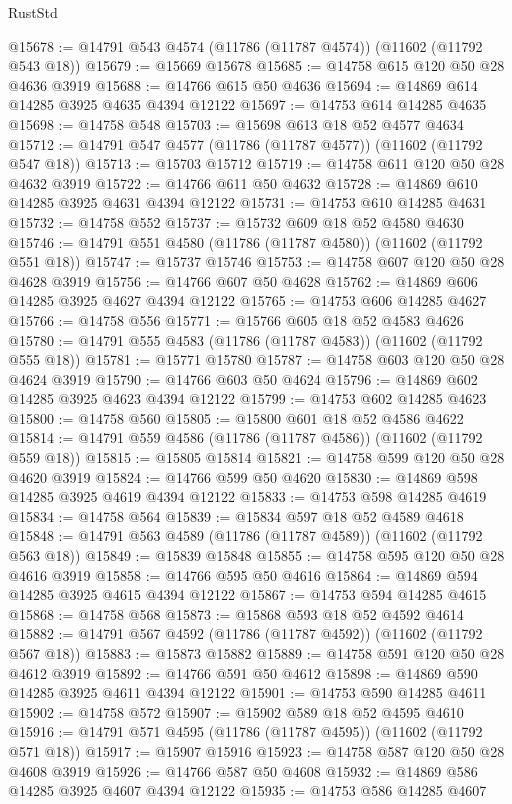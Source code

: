 \begin{lexlean}{RustStd}
\begin{coremodule}
@15678 := @14791 @543 @4574 (@11786 (@11787 @4574)) (@11602 (@11792 @543 @18))
@15679 := @15669 @15678
@15685 := @14758 @615 @120 @50 @28 @4636 @3919
@15688 := @14766 @615 @50 @4636
@15694 := @14869 @614 @14285 @3925 @4635 @4394 @12122
@15697 := @14753 @614 @14285 @4635
@15698 := @14758 @548
@15703 := @15698 @613 @18 @52 @4577 @4634
@15712 := @14791 @547 @4577 (@11786 (@11787 @4577)) (@11602 (@11792 @547 @18))
@15713 := @15703 @15712
@15719 := @14758 @611 @120 @50 @28 @4632 @3919
@15722 := @14766 @611 @50 @4632
@15728 := @14869 @610 @14285 @3925 @4631 @4394 @12122
@15731 := @14753 @610 @14285 @4631
@15732 := @14758 @552
@15737 := @15732 @609 @18 @52 @4580 @4630
@15746 := @14791 @551 @4580 (@11786 (@11787 @4580)) (@11602 (@11792 @551 @18))
@15747 := @15737 @15746
@15753 := @14758 @607 @120 @50 @28 @4628 @3919
@15756 := @14766 @607 @50 @4628
@15762 := @14869 @606 @14285 @3925 @4627 @4394 @12122
@15765 := @14753 @606 @14285 @4627
@15766 := @14758 @556
@15771 := @15766 @605 @18 @52 @4583 @4626
@15780 := @14791 @555 @4583 (@11786 (@11787 @4583)) (@11602 (@11792 @555 @18))
@15781 := @15771 @15780
@15787 := @14758 @603 @120 @50 @28 @4624 @3919
@15790 := @14766 @603 @50 @4624
@15796 := @14869 @602 @14285 @3925 @4623 @4394 @12122
@15799 := @14753 @602 @14285 @4623
@15800 := @14758 @560
@15805 := @15800 @601 @18 @52 @4586 @4622
@15814 := @14791 @559 @4586 (@11786 (@11787 @4586)) (@11602 (@11792 @559 @18))
@15815 := @15805 @15814
@15821 := @14758 @599 @120 @50 @28 @4620 @3919
@15824 := @14766 @599 @50 @4620
@15830 := @14869 @598 @14285 @3925 @4619 @4394 @12122
@15833 := @14753 @598 @14285 @4619
@15834 := @14758 @564
@15839 := @15834 @597 @18 @52 @4589 @4618
@15848 := @14791 @563 @4589 (@11786 (@11787 @4589)) (@11602 (@11792 @563 @18))
@15849 := @15839 @15848
@15855 := @14758 @595 @120 @50 @28 @4616 @3919
@15858 := @14766 @595 @50 @4616
@15864 := @14869 @594 @14285 @3925 @4615 @4394 @12122
@15867 := @14753 @594 @14285 @4615
@15868 := @14758 @568
@15873 := @15868 @593 @18 @52 @4592 @4614
@15882 := @14791 @567 @4592 (@11786 (@11787 @4592)) (@11602 (@11792 @567 @18))
@15883 := @15873 @15882
@15889 := @14758 @591 @120 @50 @28 @4612 @3919
@15892 := @14766 @591 @50 @4612
@15898 := @14869 @590 @14285 @3925 @4611 @4394 @12122
@15901 := @14753 @590 @14285 @4611
@15902 := @14758 @572
@15907 := @15902 @589 @18 @52 @4595 @4610
@15916 := @14791 @571 @4595 (@11786 (@11787 @4595)) (@11602 (@11792 @571 @18))
@15917 := @15907 @15916
@15923 := @14758 @587 @120 @50 @28 @4608 @3919
@15926 := @14766 @587 @50 @4608
@15932 := @14869 @586 @14285 @3925 @4607 @4394 @12122
@15935 := @14753 @586 @14285 @4607

\end{coremodule}
\end{lexlean}

